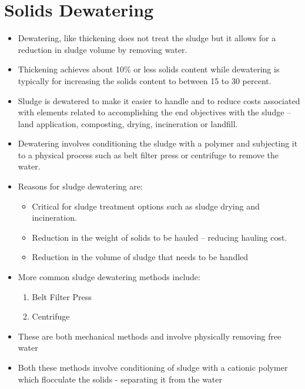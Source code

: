 
\chapter{Solids Dewatering}



        \begin{itemize}
        	\item Dewatering, like thickening does not treat the sludge but it allows for a reduction in sludge volume by removing water.  
        	\item Thickening achieves about 10\% or less solids content while dewatering is typically for increasing the solids content to between 15 to 30 percent. 
        	\item Sludge is dewatered to make it easier to handle and to reduce costs associated with elements related to accomplishing the end objectives with the sludge – land application, composting, drying, incineration or landfill.
        	\item Dewatering involves conditioning the sludge with a polymer and subjecting it to a physical process such as belt filter press or centrifuge to remove the water. 
        	\item Reasons for sludge dewatering are:
				\begin{itemize}
					\item Critical for sludge treatment options such as sludge drying and incineration.
					\item Reduction in the weight of solids to be hauled – reducing hauling cost.
					\item Reduction in the volume of sludge that needs to be handled
				\end{itemize}
			\item More common sludge dewatering methods include:
				\begin{enumerate}
					\item Belt Filter Press 
					\item Centrifuge
				\end{enumerate}
			\item These are both mechanical methods and involve physically removing free water
			\item Both these methods involve conditioning of sludge with a cationic polymer which flocculate the solids - separating it from the water

		\end{itemize}

